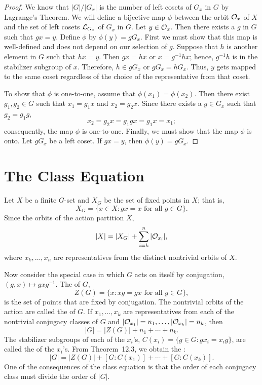  
\begin{proof}
We know that  $|G|/|G_x|$ is the number of left cosets of $G_x$ in $G$
by Lagrange's Theorem. We will define a bijective  map $\phi$
between the orbit ${\cal O}_x$ of $X$ and the set of left cosets 
${\cal L}_{G_x}$ of $G_x$ in $G$. Let $y \in {\cal O}_x$. Then there 
exists a $g$ in $G$ such that $g x = y$. Define $\phi$ by $\phi( y ) 
= g G_x$. First we must show that this map is well-defined and does 
not depend on our selection of $g$. Suppose that $h$ is another 
element in $G$ such that $hx = y$. Then $g x = h x$ or $x= g^{-1} h x$; 
hence, $g^{-1}h$ is in the stabilizer subgroup of $x$. Therefore, 
$h \in g G_x$ or $g G_x = h G_x$.  Thus, $y$ gets mapped to the same 
coset regardless of the choice of the representative from that coset.
 
 
To show that $\phi$ is one-to-one, assume that $\phi(x_1) =
\phi(x_2)$. Then there exist $g_1, g_2 \in G$ such that $x_1 = g_1 x$
and $x_2 = g_2 x$. Since there exists a $g \in G_x$ such that $g_2=g_1
g$, 
$$
x_2 = g_2 x = g_1 g x = g_1 x = x_1;
$$
consequently, the map $\phi$ is  one-to-one. Finally, we must show
that the map $\phi$ is onto. Let $g G_x$ be a left coset. If $g x =
y$, then $\phi(y) = g G_x$. 
\end{proof}
 
 
 
 
\section{The Class Equation}
 
 
 
Let $X$ be a finite $G$-set and $X_G$\label{noteXG} be the set of fixed 
points in $X$; that is, 
$$
X_G = \{ x \in X : gx = x \mbox{ for all $g \in G$} \}.
$$
Since the orbits of the action partition $X$,
$$
|X| = |X_G| + \sum_{i = k}^n |{\cal O}_{x_i}|,
$$
where $x_k, \ldots, x_n$ are representatives from the distinct
nontrivial orbits of $X$. 
 
 
Now consider the special case in which $G$ acts on itself by conjugation,
$(g,x) \mapsto gxg^{-1}$. The  of
$G$, 
$$
Z(G) = \{x : xg = gx \mbox{ for all $g \in G$} \},
$$
is the set of points that are fixed by conjugation. The nontrivial
orbits of the action are called the  of $G$. If $x_1, \ldots, x_k$ are
representatives from each of the nontrivial conjugacy classes of $G$
and $|{\cal O}_{x_1}| = n_1, \ldots, |{\cal O}_{x_k}| = n_k$, then 
$$
|G| = |Z(G)| + n_1 + \cdots + n_k.
$$
The stabilizer subgroups of each of the $x_i$'s, $C(x_i) = \{ g \in G
: g x_i = x_i g \}$, are called the  of the $x_i$'s. From Theorem~12.3, we obtain the : 
$$
|G| = |Z(G)| + [G: C(x_1) ] + \cdots + [ G: C(x_k)].
$$
One of the consequences of the class equation is that the order of
each conjugacy class must divide the order of $|G|$.
 
